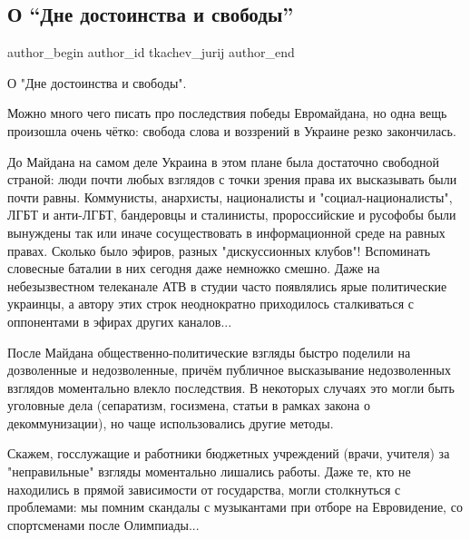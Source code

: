  
 
 
 
 

\subsection{О \enquote{Дне достоинства и свободы}}
\label{sec:19_11_2021.tg.tkachev_jurij.1.revgidnosti}


\ifcmt
 author_begin
   author_id tkachev_jurij
 author_end
\fi

О "Дне достоинства и свободы". 

Можно много чего писать про последствия победы Евромайдана, но одна вещь
произошла очень чётко: свобода слова и воззрений в Украине резко закончилась. 

До Майдана на самом деле Украина в этом плане была достаточно свободной
страной: люди почти любых взглядов с точки зрения права их высказывать были
почти равны. Коммунисты, анархисты, националисты и "социал-националисты", ЛГБТ
и анти-ЛГБТ, бандеровцы и сталинисты, пророссийские и русофобы были вынуждены
так или иначе сосуществовать в информационной среде на равных правах. Сколько
было эфиров, разных "дискуссионных клубов"! Вспоминать словесные баталии в них
сегодня даже немножко смешно. Даже на небезызвестном телеканале АТВ в студии
часто появлялись ярые политические украинцы, а автору этих строк неоднократно
приходилось сталкиваться с оппонентами в эфирах других каналов... 

После Майдана общественно-политические взгляды быстро поделили на дозволенные и
недозволенные, причём публичное высказывание недозволенных взглядов моментально
влекло последствия. В некоторых случаях это могли быть уголовные дела
(сепаратизм, госизмена, статьи в рамках закона о декоммунизации), но чаще
использовались другие методы. 

Скажем, госслужащие и работники бюджетных учреждений (врачи, учителя) за
"неправильные" взгляды моментально лишались работы. Даже те, кто не находились
в прямой зависимости от государства, могли столкнуться с проблемами: мы помним
скандалы с музыкантами при отборе на Евровидение, со спортсменами после
Олимпиады...

